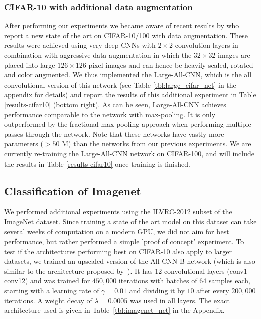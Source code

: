 \documentclass{article} %
\begin{document}
\subsubsection{CIFAR-10 with additional data augmentation}
After performing our experiments we became aware of recent results by \citet{Graham2015} who report
a new state of the art on CIFAR-10/100 with data augmentation. These results 
were achieved using very deep CNNs with $2 \times 2$ convolution layers in combination with aggressive data augmentation 
in which the $32 \times 32$ images are placed into large $126 \times 126$ pixel images and can hence be 
heavily scaled, rotated and color augmented. We thus implemented the Large-All-CNN, which is the all convolutional version of this network (see Table \ref{tbl:large_cifar_net} in the appendix for details) and 
report the results of this additional experiment in Table \ref{results-cifar10} (bottom right).
As can be seen, Large-All-CNN achieves performance comparable to the network with max-pooling. 
It is only outperformed by the fractional max-pooling approach when performing multiple passes through the network. Note
that these networks have vastly more parameters ($> 50$ M) than the
networks from our previous experiments.
We are currently re-training the Large-All-CNN network on CIFAR-100,
and will include the results in Table \ref{results-cifar10} once training is finished. 

\subsection{Classification of Imagenet}
We performed additional experiments using the ILVRC-2012 subset of the ImageNet dataset. Since training a state of the art model on this dataset can take several weeks of computation on a modern GPU, we did not aim for best performance, but rather performed a simple 'proof of concept' experiment. To test if the architectures performing best on CIFAR-10 also apply to larger datasets, we trained an upscaled version of the All-CNN-B network (which is also similar to the architecture proposed by~\citet{Lin_2014}). %
It has 12 convolutional layers (conv1-conv12) and was trained for $450,000$ iterations with batches of $64$ samples each, starting with a learning rate of $\gamma = 0.01$ and dividing it by $10$ after every $200,000$ iterations. A weight decay of $\lambda = 0.0005$ was used in all layers. The exact architecture used is given in Table~\ref{tbl:imagenet_net} in the Appendix.
\end{document}
